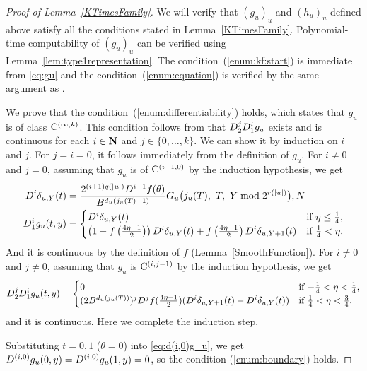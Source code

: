 \begin{proof}[Proof of Lemma~\ref{KTimesFamily}]
We will verify that $(g_u)_u$ and $(h_u)_u$ defined above satisfy all the conditions stated in Lemma~\ref{KTimesFamily}.
Polynomial-time computability of $(g_u)_u$ can be verified using Lemma~\ref{lem:type1representation}.
The condition~(\ref{enum:kf:start}) is immediate from \eqref{eq:gu} and
the condition~(\ref{enum:equation}) is verified by the same argument as
\cite[Lemma 4.1]{kawamura2010lipschitz}.

We prove that the condition~(\ref{enum:differentiability}) holds, 
which states that $g _u$ is of class $\mathrm C^{(\infty, k)}$.
This condition follows from that $D_2^j D_1^i g_u$ exists and is continuous for each $i \in \mathbf N$ and $j \in \{0, \dots, k\}$.
We can show it by induction on $i$ and $j$.
For $j=i=0$, it follows immediately from the definition of $g_u$.
For $i \neq 0$ and $j = 0$, assuming that $g_u$ is of $\mathrm C^{(i-1, 0)}$ by the induction hypothesis, we get
  \begin{align}
   D^i \delta_{u,Y}(t) 
&
    = \frac{2^{(i+1)q(|u|)} D^{i+1}f(\theta)}{B^{d_u(j_u(T)+1)}}
    G_u\bigl( j_u(T),\ T,\ Y \bmod 2^{r(|u|)} \bigr),N 
\\ 
    D_1^i g_u(t, y)
&
     = \begin{cases}
 	D^i \delta_{u, Y}(t) 
	& \text{if} \ \eta \le \frac 1 4, 
	\\
	\left( 1-f \left(\frac{4\eta-1}{2}\right)\right) 
	D^i \delta_{u, Y}(t)
	+ f \left(\frac{4\eta-1}{2}\right) D^i \delta_{u,Y+1}(t) 
	& \text{if} \ \frac 1 4 < \eta.
       \end{cases} \label{eq:d(i,0)g_u}
  \end{align}
And it is continuous
by the definition of $f$ (Lemma~\ref{SmoothFunction}).
For $i \neq 0$ and $j \neq 0$, assuming that $g_u$ is $\mathrm C^{(i, j-1)}$ by the induction hypothesis, we get
  \begin{equation} \label{eq:d(i,j)g_u}
    D_2^j D_1^i g_u(t, y)
     = \begin{cases}
	0 & \text{if} \ {-\frac 1 4} < \eta < \frac 1 4, \\
	(2B^{d_u(j_u(T))})^j D^j f(\frac{4\eta - 1}2)
	(D^i \delta_{u,Y+1}(t)-D^i \delta_{u, Y}(t)) 
	& \text{if} \ \frac 1 4 < \eta < \frac 3 4.
       \end{cases}
  \end{equation}
and it is continuous.
Here we complete the induction step.

Substituting $t = 0, 1$ ($\theta = 0$) into \eqref{eq:d(i,0)g_u},
we get $D^{(i, 0)} g_u(0,y) = D^{(i, 0)} g_u(1,y) = 0$, 
so the condition (\ref{enum:boundary}) holds.


\end{proof}
